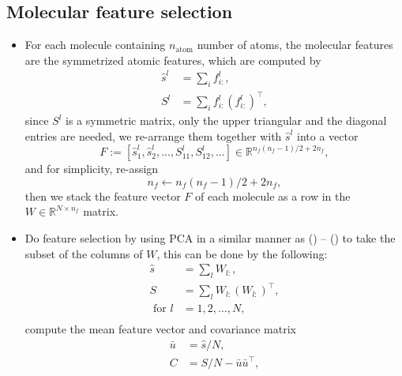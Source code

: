 \documentclass[12pt]{article}
\begin{document}
\subsection{Molecular feature selection}
\begin{itemize}
    \item For each molecule containing $n_\text{atom}$ number of atoms, the molecular features are the symmetrized atomic features, which are computed by
        \begin{equation}
			\label{eq:acsf}
            \begin{split}
                \hat{s}^l &= \sum_i f^l_{i:}, \\
                S^l &= \sum_i f^l_{i:}(f^l_{i:})^\top,
            \end{split}
        \end{equation}
        since $S^l$ is a symmetric matrix, only the upper triangular and the diagonal entries are needed, we re-arrange them together with $\hat{s}^l$ into a vector
        \begin{equation}
			F := [\hat{s}^l_1, \hat{s}^l_2, ..., S^l_{11}, S^l_{12}, ... ] \in \mathbb{R}^{n_f(n_f-1)/2 + 2n_f},
        \end{equation}
    	and for simplicity, re-assign
    	\begin{equation}
    		n_f \leftarrow n_f(n_f-1)/2 + 2n_f,
    	\end{equation}
    	then we stack the feature vector $F$ of each molecule as a row in the $W \in \mathbb{R}^{N \times n_f}$ matrix.
    \item Do feature selection by using PCA in a similar manner as () -- () to take the subset of the columns of $W$, this can be done by the following:
	    \begin{equation}
			\label{eq:pca_mol_start}
			\begin{split}
				\hat{s} &= \sum_l W_{l:}, \\
				S &= \sum_l W_{l:}(W_{l:})^\top, \\
				\text{ for } l &= 1,2,...,N, \\
			\end{split}
	    \end{equation}
		compute the mean feature vector and covariance matrix
		\begin{equation}
			\begin{split}
				\bar{u} &= \hat{s}/N, \\
				C &= S/N - \bar{u}\bar{u}^\top, \\			

\end{split}
\end{equation}
\end{itemize}
\end{document}
